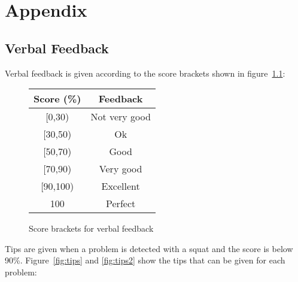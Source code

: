 \chapter{Appendix}

\section{Verbal Feedback}
\label{sec:appendix_feedback}

Verbal feedback is given according to the score brackets shown in figure~\ref{fig:score_brackets}:

\begin{figure}[H]
    \centering
	\begin{tabular}{ | c | c | }
		\hline
	    \textbf{Score (\%)} & \textbf{Feedback}\\ \hline
	    [0,30) & Not very good \\ \hline
		[30,50) & Ok \\ \hline
		[50,70) & Good \\ \hline
		[70,90) & Very good \\ \hline
		[90,100) & Excellent \\ \hline
		100 & Perfect \\ \hline
	\end{tabular}
\caption{Score brackets for verbal feedback}
\label{fig:score_brackets}
\end{figure}

Tips are given when a problem is detected with a squat and the score is below 90\%. Figure~\ref{fig:tips} and \ref{fig:tips2} show the tips that can be given for each problem:

